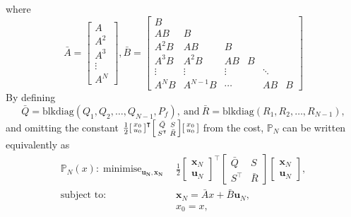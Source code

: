 \documentclass[a4paper,11pt,reqno]{amsart}
\newcommand{\tran}{\intercal}
\DeclareMathOperator*{\minimise}{minimise}
\begin{document}
where
\begin{equation}
    \bar{A}=
    \begin{bmatrix}
        A
        \\
        A^2
        \\
        A^3
        \\
        \vdots
        \\
        A^N
    \end{bmatrix},
    \bar{B}=
    \begin{bmatrix}
        B
        \\
        AB&B
        \\
        A^2B&AB&B
        \\
        A^3B&A^2B&AB&B
        \\
        \vdots&\vdots&\vdots&&\ddots
        \\
        A^NB&A^{N-1}B&\cdots&&AB&B
    \end{bmatrix}
\end{equation}
By defining
\begin{equation}
    \bar{Q}=\mathrm{blkdiag}(Q_1,Q_2,\ldots,Q_{N-1},P_f),\ \text{and}\ \bar{R}=\mathrm{blkdiag}(R_1,R_2,\ldots,R_{N-1}),
\end{equation}
and omitting the constant $\tfrac{1}{2}
\begin{bsmallmatrix}
    x_0\\
    u_0
\end{bsmallmatrix}^{\tran}
\begin{bsmallmatrix}
    \bar{Q}&S\\
    S^{\tran}&\bar{R}
\end{bsmallmatrix}
\begin{bsmallmatrix}
    x_0\\
    u_0
\end{bsmallmatrix}$ from the cost, $\mathbb{P}_N$ can be written equivalently as
\begin{subequations}
    \begin{align}
        \mathbb{P}_N(x): \minimise_{\bm{u_N},\bm{x_N}} \,
        & \tfrac{1}{2}
        \begin{bmatrix}
            \bm{x}_N\\
            \bm{u}_N
        \end{bmatrix}^{\tran}
        \begin{bmatrix}
            \bar{Q}&S\\
            S^{\tran}&\bar{R}
        \end{bmatrix}
        \begin{bmatrix}
            \bm{x}_N\\
            \bm{u}_N
        \end{bmatrix},
        \\
        \text{subject to: }\,
        & \bm{x}_{N} = \bar{A} x + \bar{B} \bm{u}_N,
        \\
        & x_{0} = x,
    \end{align}
\end{subequations}
\end{document}
